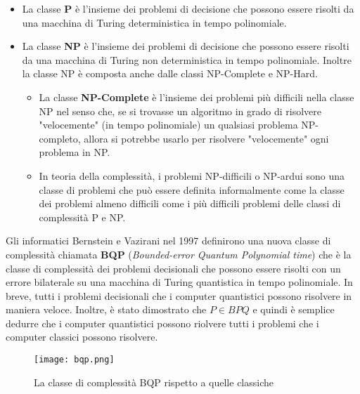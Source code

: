 \begin{itemize}
  \item La classe \textbf{P} è l'insieme dei problemi di decisione che possono essere risolti da una macchina di Turing deterministica in tempo polinomiale.
  \item La classe \textbf{NP} è l'insieme dei problemi di decisione che possono essere risolti da una macchina di Turing non deterministica in tempo polinomiale. Inoltre la classe NP è composta anche dalle classi NP-Complete e NP-Hard.
  \begin{itemize}
    \item La classe \textbf{NP-Complete} è l'insieme dei problemi più difficili nella classe NP nel senso che, se si trovasse un algoritmo in grado di risolvere "velocemente" (in tempo polinomiale) un qualsiasi problema NP-completo, allora si potrebbe usarlo per risolvere "velocemente" ogni problema in NP.
    \item In teoria della complessità, i problemi NP-difficili o NP-ardui sono una classe di problemi che può essere definita informalmente come la classe dei problemi almeno difficili come i più difficili problemi delle classi di complessità P e NP.
  \end{itemize}
\end{itemize}

Gli informatici Bernstein e Vazirani nel 1997 definirono una nuova classe di complessità chiamata \textbf{BQP} (\textit{Bounded-error Quantum Polynomial time}) \cite{bernstein1997quantum} che è la classe di complessità dei problemi decisionali che possono essere risolti con un errore bilaterale su una macchina di Turing quantistica in tempo polinomiale. In breve, tutti i problemi decisionali che i computer quantistici possono risolvere in maniera veloce. Inoltre, è stato dimostrato che \( P \in BPQ \) e quindi è semplice dedurre che i computer quantistici possono riolvere tutti i problemi che i computer classici possono risolvere.

\begin{figure}[htbp]
  \centering
  \texttt{[image: bqp.png]}
  \caption{La classe di complessità BQP rispetto a quelle classiche}
  \label{fig:bqp}
\end{figure}

